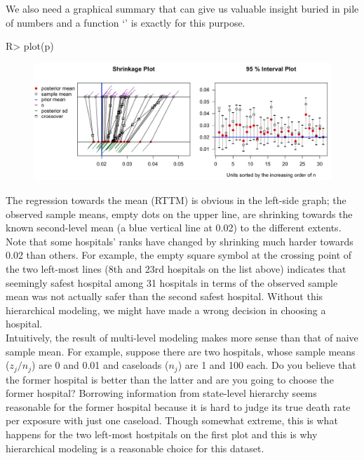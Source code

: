 \documentclass[article]{jss}
\begin{document}
We also need a graphical summary that can give us valuable insight buried in pile of numbers and a function `' is exactly for this purpose.
\begin{CodeChunk}
\begin{CodeInput}
R> plot(p)
\end{CodeInput}
\end{CodeChunk}
\begin{figure}[h]
\begin{center}
\includegraphics[scale=0.25]{hospital1.png}
\end{center}
\end{figure}

The regression towards the mean (RTTM) is obvious in the left-side graph; the observed sample means, empty dots on the upper line, are shrinking towards the known second-level mean (a blue vertical line at 0.02) to the different extents. Note that some hospitals' ranks have changed by shrinking much harder towards 0.02 than others. For example, the empty square symbol at the crossing point of the two left-most lines (8th and 23rd hospitals on the list above) indicates that seemingly safest hospital among 31 hospitals in terms of the observed sample mean was not actually safer than the second safest hospital. Without this hierarchical modeling, we might have made a wrong decision in choosing a hospital.
\\

Intuitively, the result of multi-level modeling makes more sense than that of naive sample mean. For example, suppose there are two hospitals, whose sample means ($z_{j} / n_{j}$) are 0 and 0.01 and caseloads ($n_{j}$) are 1 and 100 each. Do you believe that the former hospital is better than the latter and are you going to choose the former hospital? Borrowing information from state-level hierarchy seems reasonable for the former hospital because it is hard to judge its true death rate per exposure with just one caseload. Though somewhat extreme, this is what happens for the two left-most hostpitals on the first plot and this is why hierarchical modeling is a reasonable choice for this dataset.
\\
\end{document}
